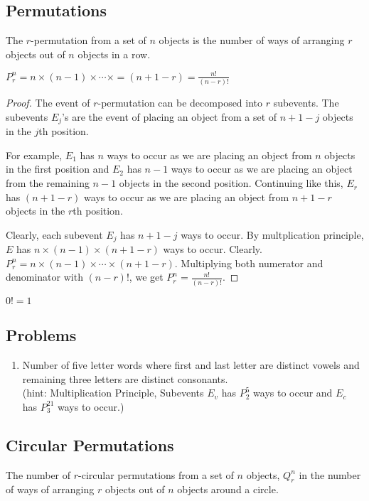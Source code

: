 \subsection{Permutations}
\begin{definition}[Permutation]
	The $r$-permutation from a set of $n$ objects is the number of ways of arranging $r$ objects out of $n$ objects in a row.
\end{definition}
\begin{theorem}
	$P^n_r = n \times (n-1) \times \dotsb \times = (n+1-r) = \frac{n!}{(n-r)!}$
\end{theorem}
\begin{proof}
	The event of $r$-permutation can be decomposed into $r$ subevents.
	The subevents $E_j$'s are the event of placing an object from a set of $n+1-j$ objects in the $j$th position.

	\begin{commentary}
	For example, $E_1$ has $n$ ways to occur as we are placing an object from $n$ objects in the first position and $E_2$ has $n-1$ ways to occur as we are placing an object from the remaining $n-1$ objects in the second position.
	Continuing like this, $E_r$ has $(n+1-r)$ ways to occur as we are placing an object from $n+1-r$ objects in the $r$th position.
	\end{commentary}

	Clearly, each subevent $E_j$ has $n+1-j$ ways to occur.
	By multplication principle, $E$ has $n \times (n-1) \times (n+1-r)$ ways to occur.
	Clearly. $P^n_r = n \times (n-1) \times \dotsb \times (n+1-r)$.
	Multiplying both numerator and denominator with $(n-r)!$, we get $P^n_r = \frac{n!}{(n-r)!}$.
\end{proof}

\begin{remark} $0! = 1$ \end{remark}

\subsection*{Problems}
\begin{enumerate}
	\item Number of five letter words where first and last letter are distinct vowels and remaining three letters are distinct consonants.\\
	(hint: Multiplication Principle, Subevents $E_v$ has $P^5_2$ ways to occur and $E_c$ has $P^{21}_3$ ways to occur.)
\end{enumerate}
\subsection{Circular Permutations}
\begin{definition}
	The number of $r$-circular permutations from a set of $n$ objects, $Q^n_r$ in the number of ways of arranging $r$ objects out of $n$ objects around a circle.
\end{definition}

